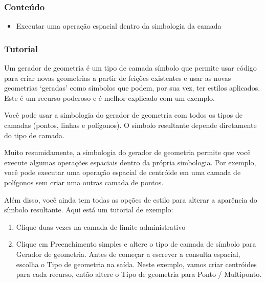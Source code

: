 \documentclass[
]{book}
\providecommand{\tightlist}{%
  \setlength{\itemsep}{0pt}\setlength{\parskip}{0pt}}
\begin{document}
\hypertarget{conteuxfado-2}{%
\subsubsection{\texorpdfstring{\textbf{Conteúdo}}{Conteúdo}}\label{conteuxfado-2}}

\begin{itemize}
\tightlist
\item
  Executar uma operação espacial dentro da simbologia da camada
\end{itemize}

\hypertarget{tutorial-1}{%
\subsubsection{\texorpdfstring{\textbf{Tutorial}}{Tutorial}}\label{tutorial-1}}

Um gerador de geometria é um tipo de camada símbolo que permite usar código para criar novas geometrias a partir de feições existentes e usar as novas geometrias `geradas' como símbolos que podem, por sua vez, ter estilos aplicados. Este é um recurso poderoso e é melhor explicado com um exemplo.

Você pode usar a simbologia do gerador de geometria com todos os tipos de camadas (pontos, linhas e polígonos). O símbolo resultante depende diretamente do tipo de camada.

Muito resumidamente, a simbologia do gerador de geometria permite que você execute algumas operações espaciais dentro da própria simbologia. Por exemplo, você pode executar uma operação espacial de centróide em uma camada de polígonos sem criar uma outras camada de pontos.

Além disso, você ainda tem todas as opções de estilo para alterar a aparência do símbolo resultante. Aqui está um tutorial de exemplo:

\begin{enumerate}
\def\labelenumi{\arabic{enumi}.}
\tightlist
\item
  Clique duas vezes na camada de limite administrativo
\item
  Clique em Preenchimento simples e altere o tipo de camada de símbolo para Gerador de geometria. Antes de começar a escrever a consulta espacial, escolha o Tipo de geometria na saída. Neste exemplo, vamos criar centróides para cada recurso, então altere o Tipo de geometria para Ponto / Multiponto.
\end{enumerate}
\end{document}
